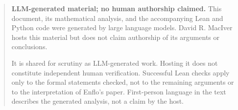 \begin{quote}
\small\normalfont
\textbf{LLM-generated material; no human authorship claimed.}
This document, its mathematical analysis, and the accompanying Lean and Python code
were generated by large language models. David R. MacIver hosts this material but
does not claim authorship of its arguments or conclusions.

It is shared for scrutiny as LLM-generated work. Hosting it does not constitute
independent human verification. Successful Lean checks apply only to the formal
statements checked, not to the remaining arguments or to the interpretation of
Enflo's paper. First-person language in the text describes the generated analysis,
not a claim by the host.
\end{quote}
